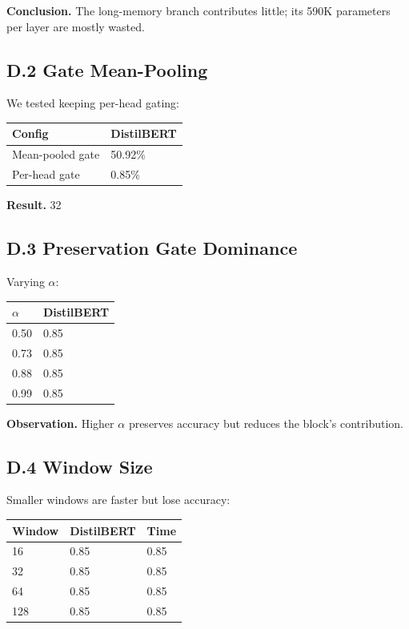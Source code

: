 \textbf{Conclusion.} The long-memory branch contributes little; its 590K 
parameters per layer are mostly wasted.

\subsection{D.2 Gate Mean-Pooling}

We tested keeping per-head gating:

\begin{table}[H]
\centering
\small
\begin{tabular}{ll}
\toprule
\textbf{Config} & \textbf{DistilBERT} \\
\midrule
Mean-pooled gate & 50.92\% \\
Per-head gate & 0.85\% \\
\bottomrule
\end{tabular}
\end{table}

\textbf{Result.} 32

\subsection{D.3 Preservation Gate Dominance}

Varying $\alpha$:

\begin{table}[H]
\centering
\small
\begin{tabular}{ll}
\toprule
\textbf{$\alpha$} & \textbf{DistilBERT} \\
\midrule
0.50 & 0.85 \\
0.73 & 0.85 \\
0.88 & 0.85 \\
0.99 & 0.85 \\
\bottomrule
\end{tabular}
\end{table}

\textbf{Observation.} Higher $\alpha$ preserves accuracy but reduces the block's 
contribution.

\subsection{D.4 Window Size}

Smaller windows are faster but lose accuracy:

\begin{table}[H]
\centering
\small
\begin{tabular}{lll}
\toprule
\textbf{Window} & \textbf{DistilBERT} & \textbf{Time} \\
\midrule
16 & 0.85 & 0.85 \\
32 & 0.85 & 0.85 \\
64 & 0.85 & 0.85 \\
128 & 0.85 & 0.85 \\
\bottomrule
\end{tabular}
\end{table}

